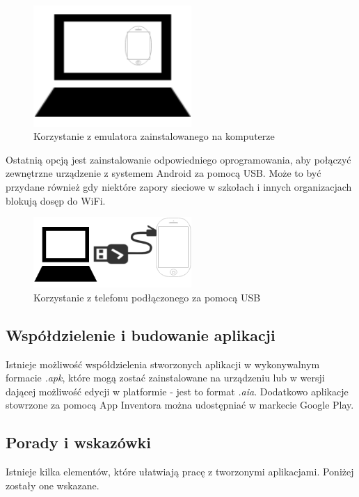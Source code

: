 \begin{figure}[H] 
\centering\includegraphics[width=6cm]{figures/option2emulator}
\caption{Korzystanie z emulatora zainstalowanego na komputerze}
\end{figure}

Ostatnią opcją jest zainstalowanie odpowiedniego oprogramowania, aby połączyć zewnętrzne urządzenie z systemem Android za pomocą USB. Może to być przydane również gdy niektóre zapory sieciowe w szkołach i innych organizacjach blokują dosęp do WiFi.\cite{android:40}

\begin{figure}[H] 
\centering\includegraphics[width=6cm]{figures/option3usb}
\caption{Korzystanie z telefonu podłączonego za pomocą USB}
\end{figure}

\subsection{Współdzielenie i budowanie aplikacji}

Istnieje możliwość współdzielenia stworzonych aplikacji w wykonywalnym formacie \emph{.apk}, które mogą zostać zainstalowane na urządzeniu lub w wersji dającej możliwość edycji w platformie - jest to format \emph{.aia}. Dodatkowo aplikacje stowrzone za pomocą App Inventora można udostępniać w markecie Google Play.\cite{android:41}

\subsection{Porady i wskazówki}

Istnieje kilka elementów, które ułatwiają pracę z tworzonymi aplikacjami. Poniżej zostały one wskazane.\cite{android:42}

